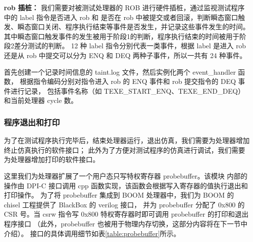 \textbf{rob 插桩：}
我们需要对被测试处理器的 ROB 进行硬件插桩，通过监视测试程序中的 label 指令是否进入 rob 和
是否在 rob 中被提交或者回滚，判断瞬态窗口触发、瞬态窗口关闭、程序执行结束等事件是否发生，并记录这些事件发生的时间。
其中瞬态窗口触发事件的发生被用于阶段1的判断，程序执行结束的时间被用于阶段2差分测试的判断。
12 种 label 指令分别代表一类事件，根据 label 是进入 rob 还是从 rob 中提交可以分为 ENQ 和 DEQ 两种子事件，所以一共有 24 种事件。\par

首先创建一个记录时间信息的 taint.log 文件，然后实例化两个 event\_handler 函数，
根据指令编码分别对指令进入 rob 的 ENQ 事件和 rob 提交指令的 DEQ 事件进行记录，
包括事件名称（如 TEXE\_START\_ENQ、TEXE\_END\_DEQ）和当前处理器 cycle 数。

\subsubsection{程序退出和打印}
为了在测试程序执行完毕后，结束处理器运行，退出仿真，我们需要为处理器增加终止仿真执行的软件接口；
此外为了方便对测试程序的仿真进行调试，我们需要为处理器增加打印的软件接口。\par

这里我们为处理器扩展了一个用户态只写特权寄存器 probebuffer。该模块
内部的操作由 DPI-C 接口调用 cpp 函数实现，该函数会根据写入寄存器的值执行退出和打印操作。
为了将 probebuffer 集成到 BOOM 处理器中，我们为 BOOM 的 chisel 工程提供了 BlackBox 的 verilog 接口，
并为 probebuffer 分配了 0x800 的 CSR 号。当 csrw 指令写 0x800 特权寄存器时即可调用 probebuffer 的打印和退出程序接口
（此外，probebuffer 也被用于物理内存切换，这部分内容将在下一节中介绍）。
接口的具体调用细节如表\ref{table:probebuffer}所示。\par

\begin{table}[h!]
    \begin{center} 
    \caption{probebuffer 软件接口} 
    \label{table:probebuffer}  
    \end{center}
\end{table}


